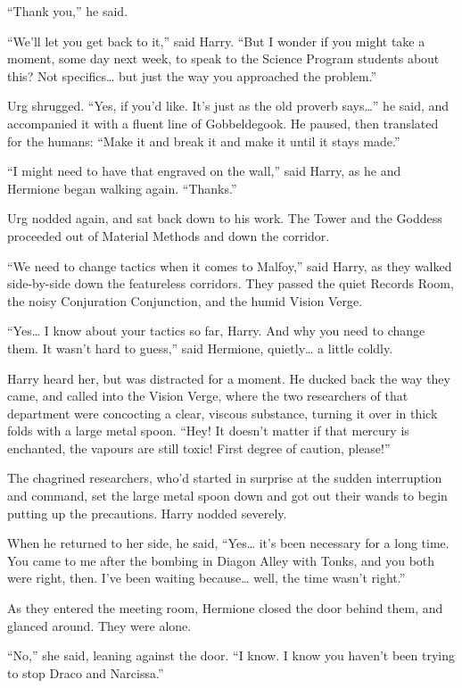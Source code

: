 ``Thank you,'' he said.

``We'll let you get back to it,'' said Harry. ``But I wonder if you
might take a moment, some day next week, to speak to the Science Program
students about this? Not specifics\ldots{} but just the way you
approached the problem.''

Urg shrugged. ``Yes, if you'd like. It's just as the old proverb
says\ldots{}'' he said, and accompanied it with a fluent line of
Gobbeldegook. He paused, then translated for the humans: ``Make it and
break it and make it until it stays made.''

``I might need to have that engraved on the wall,'' said Harry, as he
and Hermione began walking again. ``Thanks.''

Urg nodded again, and sat back down to his work. The Tower and the
Goddess proceeded out of Material Methods and down the corridor.

``We need to change tactics when it comes to Malfoy,'' said Harry, as
they walked side-by-side down the featureless corridors. They passed the
quiet Records Room, the noisy Conjuration Conjunction, and the humid
Vision Verge.

``Yes\ldots{} I know about your tactics so far, Harry. And why you need
to change them. It wasn't hard to guess,'' said Hermione,
quietly\ldots{} a little coldly.

Harry heard her, but was distracted for a moment. He ducked back the way
they came, and called into the Vision Verge, where the two researchers
of that department were concocting a clear, viscous substance, turning
it over in thick folds with a large metal spoon. ``Hey! It doesn't
matter if that mercury is enchanted, the vapours are still toxic! First
degree of caution, please!''

The chagrined researchers, who'd started in surprise at the sudden
interruption and command, set the large metal spoon down and got out
their wands to begin putting up the precautions. Harry nodded severely.

When he returned to her side, he said, ``Yes\ldots{} it's been necessary
for a long time. You came to me after the bombing in Diagon Alley with
Tonks, and you both were right, then. I've been waiting because\ldots{}
well, the time wasn't right.''

As they entered the meeting room, Hermione closed the door behind them,
and glanced around. They were alone.

``No,'' she said, leaning against the door. ``I know. I know you haven't
been trying to stop Draco and Narcissa.''

